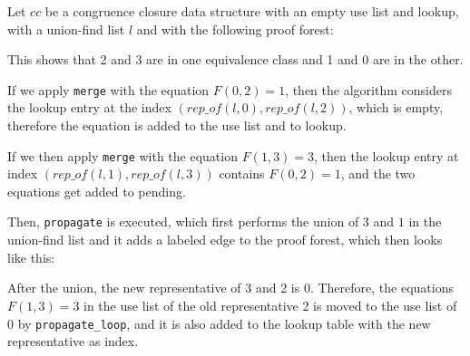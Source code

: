 \begin{exmp}\label{example:merge}
Let $cc$ be a congruence closure data structure with an empty use list and lookup, with a union-find list $l$ and with the following proof forest:
\begin{center}
\end{center}


This shows that 2 and 3 are in one equivalence class and 1 and 0 are in the other.

If we apply \lstinline{merge} with the equation $F(0,2) = 1$, then the algorithm considers the lookup entry at the index $(rep\_of(l, 0), rep\_of(l, 2))$, which is empty, therefore the equation is added to the use list and to lookup.

If we then apply \lstinline|merge| with the equation $F(1,3) = 3$, then the lookup entry at index $(rep\_of(l, 1), rep\_of(l, 3))$ contains $F(0,2) = 1$, and the two equations get added to pending.

Then, \lstinline|propagate| is executed, which first performs the union of $3$ and $1$ in the union-find list and it adds a labeled edge to the proof forest, which then looks like this:


\begin{center}
\end{center}

After the union, the new representative of 3 and 2 is 0. Therefore, the equations $F(1,3) = 3$ in the use list of the old representative 2 is moved to the use list of 0 by \lstinline|propagate_loop|, and it is also added to the lookup table with the new representative as index.
\end{exmp}

